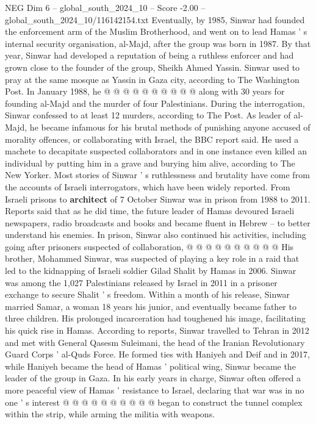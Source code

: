 \begin{textsample}{NEG Dim 6 – global\_south\_2024\_10 – Score -2.00 – global\_south\_2024\_10/116142154.txt}
Eventually, by 1985, Sinwar had founded the enforcement arm of the Muslim Brotherhood, and went on to lead Hamas ' s internal security organisation, al-Majd, after the group was born in 1987.
By that year, Sinwar had developed a reputation of being a ruthless enforcer and had grown close to the founder of the group, Sheikh Ahmed Yassin.
Sinwar used to pray at the same mosque as Yassin in Gaza city, according to The Washington Post.
In January 1988, he @ @ @ @ @ @ @ @ @ @ along with 30 years for founding al-Majd and the murder of four Palestinians.
During the interrogation, Sinwar confessed to at least 12 murders, according to The Post.
As leader of al-Majd, he became infamous for his brutal methods of punishing anyone accused of morality offences, or collaborating with Israel, the BBC report said.
He used a machete to decapitate suspected collaborators and in one instance even killed an individual by putting him in a grave and burying him alive, according to The New Yorker.
Most stories of Sinwar ' s ruthlessness and brutality have come from the accounts of Israeli interrogators, which have been widely reported.
From Israeli prisons to \textbf{architect} of 7 October Sinwar was in prison from 1988 to 2011.
Reports said that as he did time, the future leader of Hamas devoured Israeli newspapers, radio broadcasts and books and became fluent in Hebrew -- to better understand his enemies.
In prison, Sinwar also continued his activities, including going after prisoners suspected of collaboration, @ @ @ @ @ @ @ @ @ @ His brother, Mohammed Sinwar, was suspected of playing a key role in a raid that led to the kidnapping of Israeli soldier Gilad Shalit by Hamas in 2006.
Sinwar was among the 1,027 Palestinians released by Israel in 2011 in a prisoner exchange to secure Shalit ' s freedom.
Within a month of his release, Sinwar married Samar, a woman 18 years his junior, and eventually became father to three children.
His prolonged incarceration had toughened his image, facilitating his quick rise in Hamas.
According to reports, Sinwar travelled to Tehran in 2012 and met with General Qasesm Suleimani, the head of the Iranian Revolutionary Guard Corps ' al-Quds Force.
He formed ties with Haniyeh and Deif and in 2017, while Haniyeh became the head of Hamas ' political wing, Sinwar became the leader of the group in Gaza.
In his early years in charge, Sinwar often offered a more peaceful view of Hamas ' resistance to Israel, declaring that war was in no one ' s interest @ @ @ @ @ @ @ @ @ @ began to construct the tunnel complex within the strip, while arming the militia with weapons.

\end{textsample}
